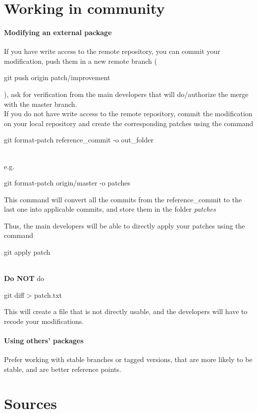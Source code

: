 \section{Working in community}

\paragraph{Modifying an external package}
If you have write access to the remote repository, you can commit your modification, push them in a new remote branch (\begin{tt}git push origin patch/improvement\end{tt}), ask for verification from the main developers that will do/authorize the merge with the master branch. \\


If you do not have write access to the remote repository, commit the modification on your local repository and create the corresponding patches using the command 
\begin{tt}git format-patch reference\_commit -o out\_folder\end{tt}\\
e.g. 
\begin{tt}git format-patch origin/master -o patches\end{tt}

This command will convert all the commits from the reference\_commit to the last one into applicable commits,
and store them in the folder \textit{patches}

Thus, the main developers will be able to directly apply your patches using the command
\begin{tt}git apply patch\end{tt}\\

\textbf{Do NOT} do \begin{tt}git diff > patch.txt\end{tt}
This will create a file that is not directly usable, and the developers will have to recode your modifications.

\paragraph{Using others' packages}
Prefer working with stable branches or tagged versions, that are more likely to be stable, and are better reference points.



\section{Sources}

